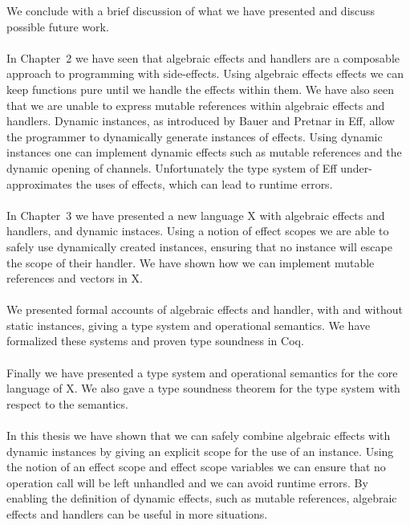 We conclude with a brief discussion of what we have presented and discuss possible future work.
\\\\
In Chapter~2 we have seen that algebraic effects and handlers are a composable approach to programming with side-effects.
Using algebraic effects effects we can keep functions pure until we handle the effects within them.
We have also seen that we are unable to express mutable references within algebraic effects and handlers.
Dynamic instances, as introduced by Bauer and Pretnar in Eff, allow the programmer to dynamically generate instances of effects.
Using dynamic instances one can implement dynamic effects such as mutable references and the dynamic opening of channels.
Unfortunately the type system of Eff under-approximates the uses of effects, which can lead to runtime errors.
\\\\
In Chapter~3 we have presented a new language X with algebraic effects and handlers, and dynamic instaces.
Using a notion of effect scopes we are able to safely use dynamically created instances, ensuring that no instance will escape the scope of their handler.
We have shown how we can implement mutable references and vectors in X.
 \\\\
 We presented formal accounts of algebraic effects and handler, with and without static instances, giving a type system and operational semantics.
 We have formalized these systems and proven type soundness in Coq.
 \\\\
 Finally we have presented a type system and operational semantics for the core language of X.
 We also gave a type soundness theorem for the type system with respect to the semantics.
 \\\\
 In this thesis we have shown that we can safely combine algebraic effects with dynamic instances by giving an explicit scope for the use of an instance.
Using the notion of an effect scope and effect scope variables we can ensure that no operation call will be left unhandled and we can avoid runtime errors.
By enabling the definition of dynamic effects, such as mutable references, algebraic effects and handlers can be useful in more situations.
 
